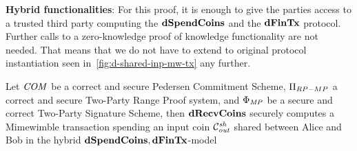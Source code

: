 \textbf{Hybrid functionalities}: For this proof, it is enough to give the parties access to a trusted third party computing the $\mathbf{dSpendCoins}$ and the $\mathbf{dFinTx}$ protocol.
Further calls to a zero-knowledge proof of knowledge functionality are not needed.
That means that we do not have to extend to original protocol instantiation seen in~\cref{fig:d-shared-inp-mw-tx} any further.

\begin{theorem}
    \label{teo:atom:sec-dshared-inp}
    Let $\mathit{COM}$ be a correct and secure Pedersen Commitment Scheme, $\Pi_{RP-MP}$ a correct and secure Two-Party Range Proof system, and $\Phi_{\mathit{MP}}$ be a secure and correct Two-Party Signature Scheme, then $\mathbf{dRecvCoins}$ securely computes a Mimewimble transaction spending an input coin $\mathcal{C}_{\mathit{out}}^{\mathit{sh}}$ shared between Alice and Bob in the hybrid $\mathbf{dSpendCoins},\mathbf{dFinTx}$-model
\end{theorem}

